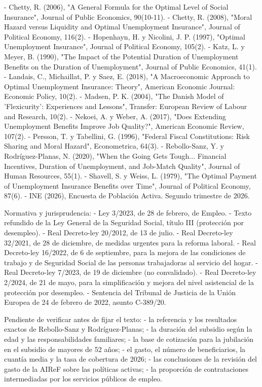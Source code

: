 \documentclass[10pt,a4paper]{article}
\begin{document}
- Chetty, R. (2006), "A General Formula for the Optimal Level of Social Insurance", Journal of Public Economics, 90(10-11).
- Chetty, R. (2008), "Moral Hazard versus Liquidity and Optimal Unemployment Insurance", Journal of Political Economy, 116(2).
- Hopenhayn, H. y Nicolini, J. P. (1997), "Optimal Unemployment Insurance", Journal of Political Economy, 105(2).
- Katz, L. y Meyer, B. (1990), "The Impact of the Potential Duration of Unemployment Benefits on the Duration of Unemployment", Journal of Public Economics, 41(1).
- Landais, C., Michaillat, P. y Saez, E. (2018), "A Macroeconomic Approach to Optimal Unemployment Insurance: Theory", American Economic Journal: Economic Policy, 10(2).
- Madsen, P. K. (2004), "The Danish Model of 'Flexicurity': Experiences and Lessons", Transfer: European Review of Labour and Research, 10(2).
- Nekoei, A. y Weber, A. (2017), "Does Extending Unemployment Benefits Improve Job Quality?", American Economic Review, 107(2).
- Persson, T. y Tabellini, G. (1996), "Federal Fiscal Constitutions: Risk Sharing and Moral Hazard", Econometrica, 64(3).
- Rebollo-Sanz, Y. y Rodríguez-Planas, N. (2020), "When the Going Gets Tough... Financial Incentives, Duration of Unemployment, and Job-Match Quality", Journal of Human Resources, 55(1).
- Shavell, S. y Weiss, L. (1979), "The Optimal Payment of Unemployment Insurance Benefits over Time", Journal of Political Economy, 87(6).
- INE (2026), Encuesta de Población Activa. Segundo trimestre de 2026.

Normativa y jurisprudencia:
- Ley 3/2023, de 28 de febrero, de Empleo.
- Texto refundido de la Ley General de la Seguridad Social, título III (protección por desempleo).
- Real Decreto-ley 20/2012, de 13 de julio.
- Real Decreto-ley 32/2021, de 28 de diciembre, de medidas urgentes para la reforma laboral.
- Real Decreto-ley 16/2022, de 6 de septiembre, para la mejora de las condiciones de trabajo y de Seguridad Social de las personas trabajadoras al servicio del hogar.
- Real Decreto-ley 7/2023, de 19 de diciembre (no convalidado).
- Real Decreto-ley 2/2024, de 21 de mayo, para la simplificación y mejora del nivel asistencial de la protección por desempleo.
- Sentencia del Tribunal de Justicia de la Unión Europea de 24 de febrero de 2022, asunto C-389/20.

Pendiente de verificar antes de fijar el texto:
- la referencia y los resultados exactos de Rebollo-Sanz y Rodríguez-Planas;
- la duración del subsidio según la edad y las responsabilidades familiares;
- la base de cotización para la jubilación en el subsidio de mayores de 52 años;
- el gasto, el número de beneficiarios, la cuantía media y la tasa de cobertura de 2026;
- las conclusiones de la revisión del gasto de la AIReF sobre las políticas activas;
- la proporción de contrataciones intermediadas por los servicios públicos de empleo.
\end{document}
